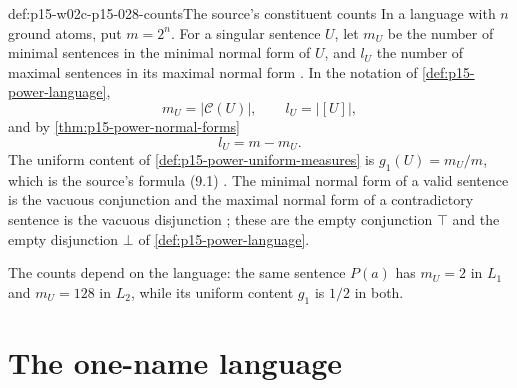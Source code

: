 \begin{hbdefinition}{def:p15-w02c-p15-028-counts}{The source's constituent counts}
In a language with \(n\) ground atoms, put \(m=2^n\). For a singular
sentence \(U\), let \(m_U\) be the number of minimal sentences in the
minimal normal form of \(U\), and \(l_U\) the number of maximal
sentences in its maximal normal form
\cite[p.~169]{HempelOppenheim1948Explanation}. In the notation of
\cref{def:p15-power-language},
\[
 m_U=|\mathcal C(U)|,\qquad l_U=|[U]|,
\]
and by \cref{thm:p15-power-normal-forms}
\[
 l_U=m-m_U .
\]
The uniform content of \cref{def:p15-power-uniform-measures} is
\(g_1(U)=m_U/m\), which is the source's formula (9.1)
\cite[p.~169]{HempelOppenheim1948Explanation}.
The minimal normal form of a valid sentence is the vacuous conjunction
and the maximal normal form of a contradictory sentence is the vacuous
disjunction \cite[pp.~166, 168]{HempelOppenheim1948Explanation}; these
are the empty conjunction \(\top\) and the empty disjunction \(\bot\)
of \cref{def:p15-power-language}.
\end{hbdefinition}

The counts depend on the language: the same sentence \(P(a)\) has
\(m_U=2\) in \(L_1\) and \(m_U=128\) in \(L_2\), while its uniform
content \(g_1\) is \(1/2\) in both.

\section{The one-name language}
\label{sec:p15-w02c-p15-028-l1}

